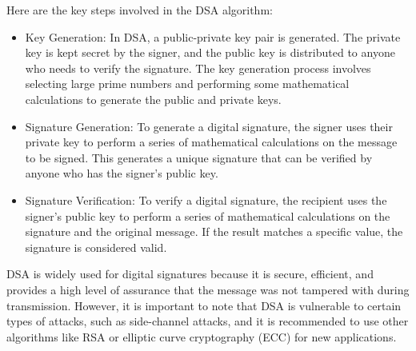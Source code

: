 \documentclass{article}
\begin{document}
Here are the key steps involved in the DSA algorithm:
\begin{itemize}
    \item Key Generation: In DSA, a public-private key pair is generated. The private key is kept secret by the signer, and the public key is distributed to anyone who needs to verify the signature. The key generation process involves selecting large prime numbers and performing some mathematical calculations to generate the public and private keys.
    \item Signature Generation: To generate a digital signature, the signer uses their private key to perform a series of mathematical calculations on the message to be signed. This generates a unique signature that can be verified by anyone who has the signer's public key.
    \item Signature Verification: To verify a digital signature, the recipient uses the signer's public key to perform a series of mathematical calculations on the signature and the original message. If the result matches a specific value, the signature is considered valid.
\end{itemize}
DSA is widely used for digital signatures because it is secure, efficient, and provides a high level of assurance that the message was not tampered with during transmission. However, it is important to note that DSA is vulnerable to certain types of attacks, such as side-channel attacks, and it is recommended to use other algorithms like RSA or elliptic curve cryptography (ECC) for new applications.
\end{document}
